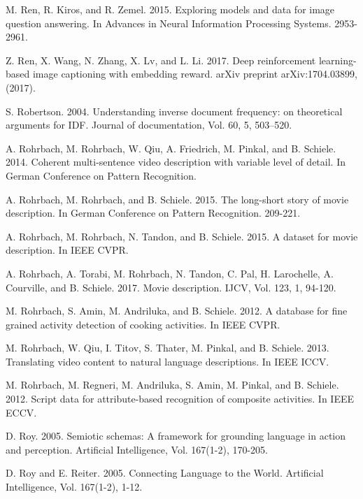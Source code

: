 \documentclass[10pt,journal,compsoc]{IEEEtran}
\begin{document}
\begin{thebibliography}{1}
M. Ren, R. Kiros, and R. Zemel. 2015. Exploring models and data for image question answering. In
Advances in Neural Information Processing Systems. 2953-2961.

Z. Ren, X. Wang, N. Zhang, X. Lv, and L. Li. 2017. Deep reinforcement learning-based image
captioning with embedding reward. arXiv preprint arXiv:1704.03899, (2017).

S. Robertson. 2004. Understanding inverse document frequency: on theoretical arguments for IDF. Journal of documentation, Vol. 60, 5, 503–520.

A. Rohrbach, M. Rohrbach, W. Qiu, A. Friedrich, M. Pinkal, and B. Schiele. 2014. Coherent multi-sentence video description with variable level of detail. In German Conference on Pattern Recognition.

A. Rohrbach, M. Rohrbach, and B. Schiele. 2015. The long-short story of movie description. In German Conference on Pattern Recognition. 209-221.

A. Rohrbach, M. Rohrbach, N. Tandon, and B. Schiele. 2015. A dataset for movie description. In IEEE CVPR.

A. Rohrbach, A. Torabi, M. Rohrbach, N. Tandon, C. Pal, H. Larochelle, A. Courville, and B. Schiele. 2017. Movie description. IJCV, Vol. 123, 1, 94-120.

M. Rohrbach, S. Amin, M. Andriluka, and B. Schiele. 2012. A database for fine grained activity detection of cooking activities. In IEEE CVPR.

M. Rohrbach, W. Qiu, I. Titov, S. Thater, M. Pinkal, and B. Schiele. 2013. Translating video content to natural language descriptions. In IEEE ICCV.

M. Rohrbach, M. Regneri, M. Andriluka, S. Amin, M. Pinkal, and B. Schiele. 2012. Script data for attribute-based recognition of composite activities. In IEEE ECCV.

D. Roy. 2005. Semiotic schemas: A framework for grounding language in action and perception. Artificial
Intelligence, Vol. 167(1-2), 170-205.

\bibitem{}
D. Roy and E. Reiter. 2005. Connecting Language to the World. Artificial Intelligence, Vol. 167(1-2), 1-12.


\end{thebibliography}
\end{document}
